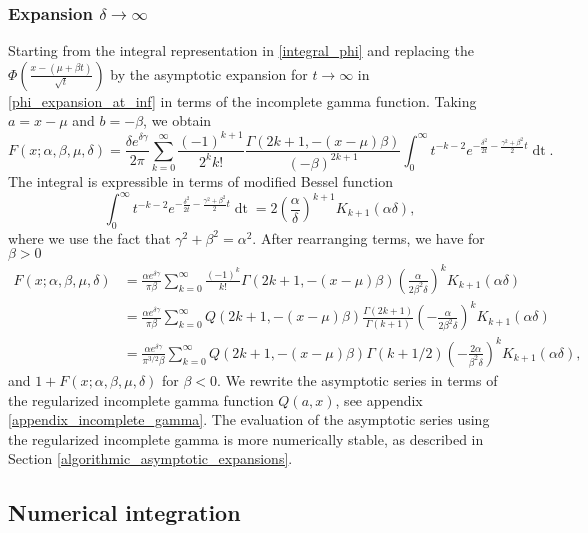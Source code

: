 \documentclass[10pt,a4paper,oneside]{article}
\numberwithin{equation}{section}
\begin{document}
\subsubsection{Expansion $\delta \to \infty$}
Starting from the integral representation in \eqref{integral_phi} and replacing the $\Phi\left(\frac{x-(\mu + \beta t)}{\sqrt{t}}\right)$ by the asymptotic expansion for $t\to \infty$ in \eqref{phi_expansion_at_inf} in terms of the incomplete gamma function. Taking $a = x -\mu$ and $b = -\beta$, we obtain
\begin{equation}
F(x; \alpha, \beta, \mu, \delta) = \frac{\delta e^{\delta \gamma}}{2\pi} \sum_{k=0}^{\infty}\frac{(-1)^{k+1}}{2^k k!} \frac{\Gamma(2k+1, -(x-\mu)\beta)}{(-\beta)^{2k+1}} \int_0^{\infty} t^{-k-2} e^{-\frac{\delta^2}{2t} - \frac{\gamma^2 + \beta^2}{2}t} \mathop{dt}.
\end{equation}
The integral is expressible in terms of modified Bessel function
\begin{equation}
\int_0^{\infty} t^{-k-2} e^{-\frac{\delta^2}{2t} - \frac{\gamma^2 + \beta^2}{2}t} \mathop{dt} = 2 \left(\frac{\alpha}{\delta}\right)^{k + 1} K_{k+1}(\alpha \delta),
\end{equation}
where we use the fact that $\gamma^2+ \beta^2 = \alpha^2$. After rearranging terms, we have for $\beta > 0$
\begin{align}
F(x; \alpha, \beta, \mu, \delta) &= \frac{\alpha e^{\delta \gamma}}{\pi \beta}\sum_{k=0}^{\infty} \frac{(-1)^k}{k!} \Gamma(2k + 1, -(x-\mu)\beta)\left(\frac{\alpha}{2\beta^2 \delta}\right)^k K_{k+1}(\alpha \delta)\\
 &=\frac{\alpha e^{\delta \gamma}}{\pi \beta}\sum_{k=0}^{\infty} Q(2k + 1, -(x-\mu)\beta)\frac{\Gamma(2k+1)}{\Gamma(k+1)}\left(-\frac{\alpha}{2\beta^2 \delta}\right)^k K_{k+1}(\alpha \delta)\\
 &=\frac{\alpha e^{\delta \gamma}}{\pi^{3/2} \beta}\sum_{k=0}^{\infty} Q(2k + 1, -(x-\mu)\beta) \Gamma(k + 1/2)\left(-\frac{2\alpha}{\beta^2 \delta}\right)^k K_{k+1}(\alpha \delta),
\end{align}
and $1 + F(x; \alpha, \beta, \mu, \delta)$ for $\beta < 0$. We rewrite the asymptotic series in terms of the regularized incomplete gamma function $Q(a, x)$, see appendix \ref{appendix_incomplete_gamma}. The evaluation of the asymptotic series using the regularized incomplete gamma is more numerically stable, as described in Section \ref{algorithmic_asymptotic_expansions}.


\subsection{Numerical integration}\label{section_numerical_integration}
\end{document}
